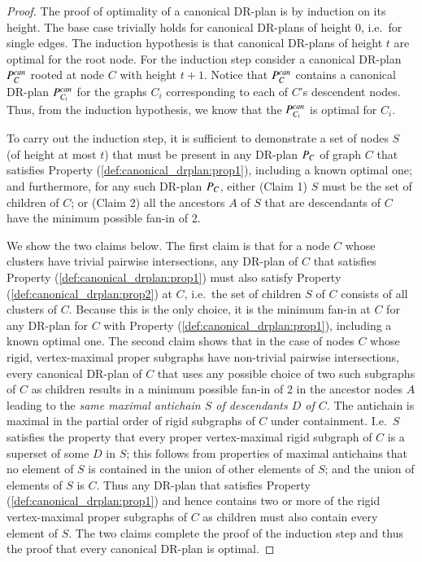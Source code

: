 \begin{proof}
    The proof of optimality of a canonical DR-plan is by induction on its height. The base case trivially holds for canonical DR-plans of height 0, i.e.\ for single edges. The induction hypothesis is that canonical DR-plans of height $t$ are optimal for the root node.
    For the induction step consider a canonical DR-plan $P_{C}^{can}$ rooted at node $C$ with height $t+1$.
    Notice that $P_{C}^{can}$ contains a canonical DR-plan $P_{C_i}^{can}$ for the graphs $C_i$ corresponding to each of $C$'s descendent nodes.
    Thus, from the induction hypothesis, we know that the $P_{C_i}^{can}$ is optimal for $C_i$.

    To carry out the induction step, it is sufficient to demonstrate a set of nodes $S$ (of height at most $t$) that must be present in any DR-plan $P_{C}$ of graph $C$ that satisfies Property (\ref{def:canonical_drplan:prop1}), including a known optimal one; and furthermore, for any such DR-plan $P_{C}$, either (Claim 1) $S$ must be the set of children of $C$; or (Claim 2) all the ancestors $A$ of $S$ that are descendants of $C$ have the minimum possible fan-in of 2.

    We show the two claims below.
    The first claim is that for a node $C$ whose clusters have trivial pairwise intersections, any DR-plan of $C$ that satisfies Property (\ref{def:canonical_drplan:prop1}) must also satisfy Property (\ref{def:canonical_drplan:prop2}) at $C$, i.e.\ the set of children $S$ of $C$ consists of all clusters of $C$.
    Because this is the only choice, it is the minimum fan-in at $C$ for any DR-plan for $C$ with Property (\ref{def:canonical_drplan:prop1}), including a known optimal one.
    The second claim shows that in the case of nodes $C$ whose rigid, vertex-maximal proper subgraphs have  non-trivial pairwise intersections, every canonical DR-plan of $C$ that uses any possible choice of two such subgraphs of $C$ as children results in a minimum possible fan-in of 2 in the ancestor nodes $A$ leading to the \emph{same maximal antichain $S$ of descendants $D$ of $C$}. The antichain is maximal in the partial order of rigid subgraphs of $C$ under containment. I.e.\ $S$ satisfies the property that every proper vertex-maximal rigid subgraph of $C$ is a superset of some $D$ in $S$; this follows from properties of maximal antichains that no element of $S$ is contained in the union of other elements of $S$; and the union of elements of $S$ is $C$. Thus any DR-plan that satisfies Property (\ref{def:canonical_drplan:prop1}) and hence contains two or more of the rigid vertex-maximal proper subgraphs of $C$ as children must also contain every element of $S$. The two claims complete the proof of the induction step and thus the proof that every canonical DR-plan is optimal.




\end{proof}

